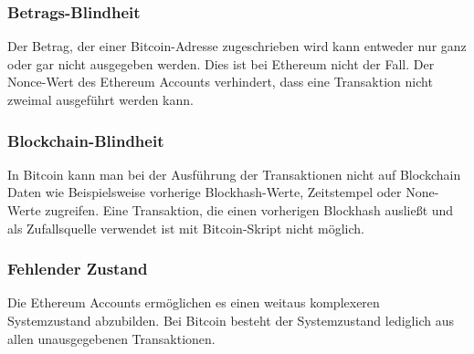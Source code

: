 \subsubsection{Betrags-Blindheit}
Der Betrag, der einer Bitcoin-Adresse zugeschrieben wird kann entweder nur ganz oder gar nicht ausgegeben werden. Dies ist bei Ethereum nicht der Fall. Der Nonce-Wert des Ethereum Accounts verhindert, dass eine Transaktion nicht zweimal ausgeführt werden kann.
\subsubsection{Blockchain-Blindheit}
In Bitcoin kann man bei der Ausführung der Transaktionen nicht auf Blockchain Daten wie Beispielsweise vorherige Blockhash-Werte, Zeitstempel oder None-Werte zugreifen. Eine Transaktion, die einen vorherigen Blockhash ausließt und als Zufallsquelle verwendet ist mit Bitcoin-Skript nicht möglich.
\subsubsection{Fehlender Zustand}
Die Ethereum Accounts ermöglichen es einen weitaus komplexeren Systemzustand abzubilden. Bei Bitcoin besteht der Systemzustand lediglich aus allen unausgegebenen Transaktionen.